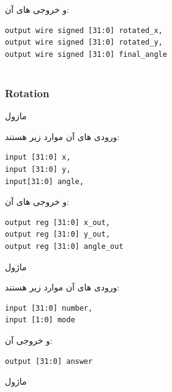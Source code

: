 \documentclass[12pt,titlepage,a4page , tikz , multi,table , svgnames,xcdraw]{article}
\begin{document}
و خروجی های آن:


\begin{latin}

\begin{verbatim}
output wire signed [31:0] rotated_x,
output wire signed [31:0] rotated_y,
output wire signed [31:0] final_angle
   
\end{verbatim}

\end{latin}


\newpage
\subsubsection{Rotation}



 مازول  

 ورودی های آن موارد زیر هستند:

\begin{latin}
\begin{verbatim}
input [31:0] x,
input [31:0] y,
input[31:0] angle,
\end{verbatim}
\end{latin}

و خروجی های آن:

\begin{latin}
\begin{verbatim}
output reg [31:0] x_out,
output reg [31:0] y_out,
output reg [31:0] angle_out
\end{verbatim}
\end{latin}

\hrulefill


ماژول   
 
 ورودی های آن موارد زیر هستند:

\begin{latin}
\begin{verbatim}
input [31:0] number,
input [1:0] mode
\end{verbatim}
\end{latin}

و خروجی آن:

\begin{latin}
\begin{verbatim}
output [31:0] answer
\end{verbatim}
\end{latin}

\hrulefill


ماژول  
\end{document}
